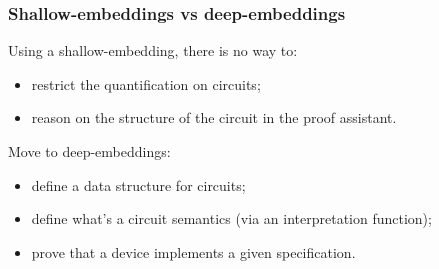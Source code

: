 \documentclass[9pt]{beamer}
\begin{document}
\begin{frame}
  \frametitle{Shallow-embeddings vs deep-embeddings}

  Using a shallow-embedding, there is no way to:
  \begin{itemize}
  \item restrict the quantification on \alert{circuits};
  \item reason on the structure of the circuit in the proof assistant.
  \end{itemize}
  
  \medskip \pause
  
  Move to deep-embeddings: 
  \begin{itemize}
  \item define a \alert{data structure for circuits};
  \item define what's a circuit semantics (via an interpretation function);
  \item prove that a device implements a given specification.
  \end{itemize}
\end{frame}
\end{document}
